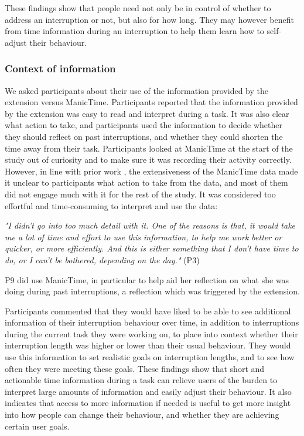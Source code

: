 These findings show that people need not only be in control of whether to address an interruption or not, but also for how long. They may however benefit from time information during an interruption to help them learn how to self-adjust their behaviour. 

\subsubsection{Context of information}
We asked participants about their use of the information provided by the extension versus ManicTime. Participants reported that the information provided by the extension was easy to read and interpret during a task. It was also clear what action to take, and participants used the information to decide whether they should reflect on past interruptions, and whether they could shorten the time away from their task. Participants looked at ManicTime at the start of the study out of curiosity and to make sure it was recording their activity correctly. However, in line with prior work \citep{Collins2014}, the extensiveness of the ManicTime data made it unclear to participants what action to take from the data, and most of them did not engage much with it for the rest of the study. It was considered too effortful and time-consuming to interpret and use the data:

\textit{"I didn’t go into too much detail with it. One of the reasons is that, it would take me a lot of time and effort to use this information, to help me work better or quicker, or more efficiently. And this is either something that I don’t have time to do, or I can’t be bothered, depending on the day."} (P3)

P9 did use ManicTime, in particular to help aid her reflection on what she was doing during past interruptions, a reflection which was triggered by the extension. 

Participants commented that they would have liked to be able to see additional information of their interruption behaviour over time, in addition to interruptions during the current task they were working on, to place into context whether their interruption length was higher or lower than their usual behaviour. They would use this information to set realistic goals on interruption lengths, and to see how often they were meeting these goals.
These findings show that short and actionable time information during a task can relieve users of the burden to interpret large amounts of information and easily adjust their behaviour. It also indicates that access to more information if needed is useful to get more insight into how people can change their behaviour, and whether they are achieving certain user goals. 

